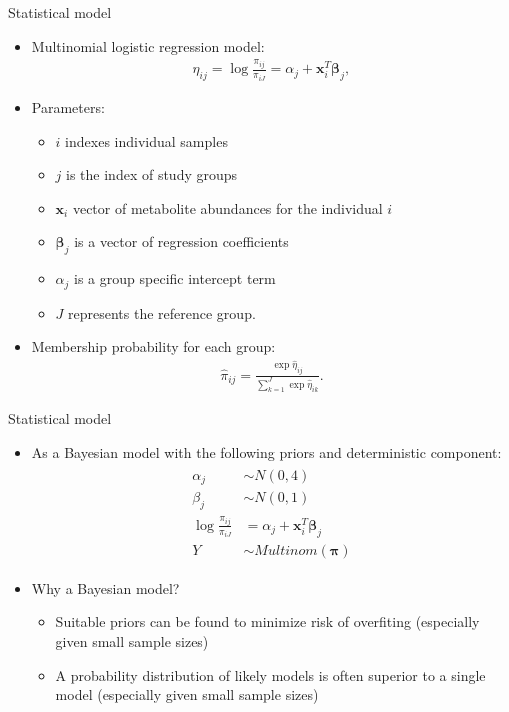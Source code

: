 \documentclass[xcolor=dvipsnames]{beamer}
\begin{document}
\begin{frame}{Statistical model}
\vspace{-10.5pt}
\begin{itemize}
\item Multinomial logistic regression model:
\begin{align*}
\eta_{ij} = \log \frac{\pi_{ij}}{\pi_{iJ}} = \alpha_j + \textbf{x}_i^T \boldsymbol{\beta}_j,
\end{align*} \pause
\item Parameters:
\begin{itemize}
\item $i$ indexes individual samples
\item $j$ is the index of study groups
\item $\textbf{x}_i$ vector of metabolite abundances for the individual $i$
\item $\boldsymbol{\beta}_j$ is a vector of regression coefficients 
\item $\alpha_j$ is a group specific intercept term
\item $J$ represents the reference group.
\end{itemize} \pause
\item Membership probability for each group:
\begin{align*}
\hat{\pi}_{ij} = \frac{\exp \hat{\eta}_{ij}}{\sum_{k=1}^{J}\exp \hat{\eta}_{ik}}.
\end{align*}
\end{itemize}
\end{frame}

\begin{frame}{Statistical model}
\vspace{-10.5pt}
\begin{itemize}
\item As a Bayesian model with the following priors and deterministic component:
\begin{align*}
\begin{split}
\alpha_j &\sim N(0,4) \\
\beta_j &\sim N(0,1) \\
\log \frac{\pi_{ij}}{\pi_{iJ}} &= \alpha_j + \textbf{x}_i^T \boldsymbol{\beta}_j \\
Y &\sim Multinom(\boldsymbol{\pi})
\end{split}
\end{align*} \pause
\item Why a Bayesian model? \pause
\begin{itemize}
	\item Suitable priors can be found to minimize risk of overfiting (especially given small sample sizes) \pause
	\item A probability distribution of likely models is often superior to a single model (especially given small sample sizes)
\end{itemize} 
\end{itemize}
\end{frame}
\end{document}
